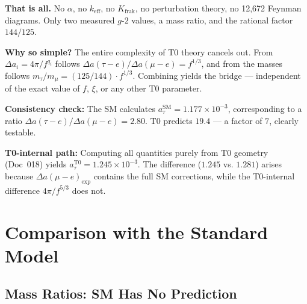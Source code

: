 \textbf{That is all.} No $\alpha$, no $k_\text{eff}$, no $K_\text{frak}$, no perturbation theory, no 12,672 Feynman diagrams. Only two measured $g$-$2$ values, a mass ratio, and the rational factor $144/125$.

\textbf{Why so simple?} The entire complexity of T0 theory cancels out. From $\Delta a_i = 4\pi/f^{q_i}$ follows $\Delta a(\tau{-}e)/\Delta a(\mu{-}e) = f^{1/3}$, and from the masses follows $m_\tau/m_\mu = (125/144) \cdot f^{1/3}$. Combining yields the bridge --- independent of the exact value of $f$, $\xi$, or any other T0 parameter.

\textbf{Consistency check:} The SM calculates $a_\tau^\text{SM} = 1.177 \times 10^{-3}$, corresponding to a ratio $\Delta a(\tau{-}e)/\Delta a(\mu{-}e) = 2.80$. T0 predicts $19.4$ --- a factor of $7$, clearly testable.

\textbf{T0-internal path:} Computing all quantities purely from T0 geometry (Doc~018) yields $a_\tau^\text{T0} = 1.245 \times 10^{-3}$. The difference ($1.245$ vs. $1.281$) arises because $\Delta a(\mu{-}e)_\text{exp}$ contains the full SM corrections, while the T0-internal difference $4\pi/f^{5/3}$ does not.

\begin{table}[h]
	\centering
	\caption{Tau predictions: T0 vs. SM}
	\label{tab:taupred}
\end{table}

\section{Comparison with the Standard Model}
\label{sec:comparison}

\subsection{Mass Ratios: SM Has No Prediction}

